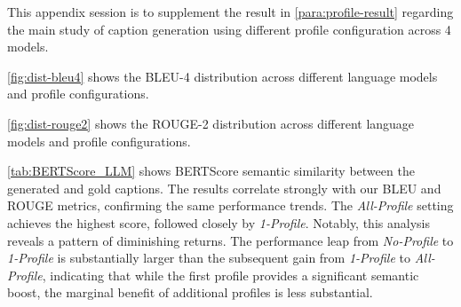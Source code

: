 This appendix session is to supplement the result in \autoref{para:profile-result} regarding the main study of caption generation using different profile configuration across 4 models.

\autoref{fig:dist-bleu4} shows the BLEU-4 distribution across different language models and profile configurations.

\autoref{fig:dist-rouge2} shows the ROUGE-2 distribution across different language models and profile configurations.

\autoref{tab:BERTScore_LLM} shows BERTScore semantic similarity between the generated and gold captions. The results correlate strongly with our BLEU and ROUGE metrics, confirming the same performance trends. The \textit{All-Profile} setting achieves the highest score, followed closely by \textit{1-Profile}. Notably, this analysis reveals a pattern of diminishing returns. The performance leap from \textit{No-Profile} to \textit{1-Profile} is substantially larger than the subsequent gain from \textit{1-Profile }to \textit{All-Profile}, indicating that while the first profile provides a significant semantic boost, the marginal benefit of additional profiles is less substantial.